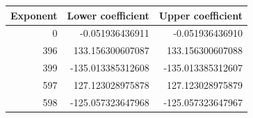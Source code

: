 \begin{tabular}{rrr}\toprule Exponent & Lower coefficient & Upper coefficient\\\midrule
0 & -0.051936436911 & -0.051936436910\\
396 & 133.156300607087 & 133.156300607088\\
399 & -135.013385312608 & -135.013385312607\\
597 & 127.123028975878 & 127.123028975879\\
598 & -125.057323647968 & -125.057323647967\\
\bottomrule\end{tabular}
